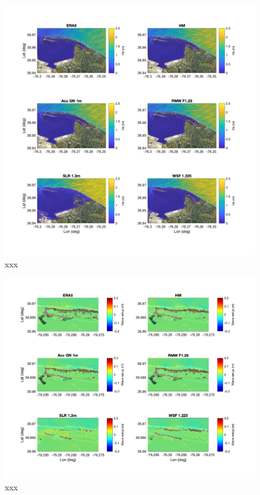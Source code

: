 \documentclass[preprint,12pt,authoryear]{elsarticle}
\begin{document}
\begin{figure}
\centering
\includegraphics[width=\textwidth]{./figures/funwave_hs_6_cases.jpg}
\caption{xxx }
\label{boundary}
\centering
\end{figure}

\begin{figure}
\centering
\includegraphics[width=\textwidth]{./figures/funwave_setup_6_cases.jpg}
\caption{xxx }
\label{boundary}
\centering
\end{figure}
\end{document}
